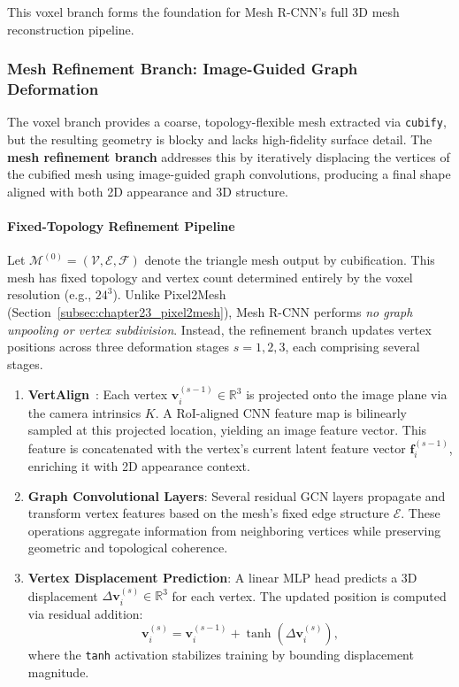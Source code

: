 This voxel branch forms the foundation for Mesh R-CNN’s full 3D mesh reconstruction pipeline.

\newpage

\subsubsection{Mesh Refinement Branch: Image-Guided Graph Deformation}
\label{subsubsec:chapter23_meshrcnn_refinement}

The voxel branch provides a coarse, topology-flexible mesh extracted via \texttt{cubify}, but the resulting geometry is blocky and lacks high-fidelity surface detail. The \textbf{mesh refinement branch} addresses this by iteratively displacing the vertices of the cubified mesh using image-guided graph convolutions, producing a final shape aligned with both 2D appearance and 3D structure.

\paragraph{Fixed-Topology Refinement Pipeline}

Let \( \mathcal{M}^{(0)} = (\mathcal{V}, \mathcal{E}, \mathcal{F}) \) denote the triangle mesh output by cubification. This mesh has fixed topology and vertex count determined entirely by the voxel resolution (e.g., \( 24^3 \)). Unlike Pixel2Mesh (Section~\ref{subsec:chapter23_pixel2mesh}), Mesh R-CNN performs \emph{no graph unpooling or vertex subdivision}. Instead, the refinement branch updates vertex positions across three deformation stages \( s = 1,2,3 \), each comprising several stages. 

\begin{enumerate}[label=(\alph*), leftmargin=1.5em]
    \item \textbf{VertAlign}~\cite{gkioxari2020_meshrcnn}: Each vertex \( \mathbf{v}_i^{(s-1)} \in \mathbb{R}^3 \) is projected onto the image plane via the camera intrinsics \( K \). A RoI-aligned CNN feature map is bilinearly sampled at this projected location, yielding an image feature vector. This feature is concatenated with the vertex’s current latent feature vector \( \mathbf{f}_i^{(s-1)} \), enriching it with 2D appearance context.
    
    \item \textbf{Graph Convolutional Layers}: Several residual GCN layers propagate and transform vertex features based on the mesh's fixed edge structure \( \mathcal{E} \). These operations aggregate information from neighboring vertices while preserving geometric and topological coherence.
    
    \item \textbf{Vertex Displacement Prediction}: A linear MLP head predicts a 3D displacement \( \Delta \mathbf{v}_i^{(s)} \in \mathbb{R}^3 \) for each vertex. The updated position is computed via residual addition:
    \[
    \mathbf{v}_i^{(s)} = \mathbf{v}_i^{(s-1)} + \tanh(\Delta \mathbf{v}_i^{(s)}),
    \]
    where the \texttt{tanh} activation stabilizes training by bounding displacement magnitude.
\end{enumerate}

